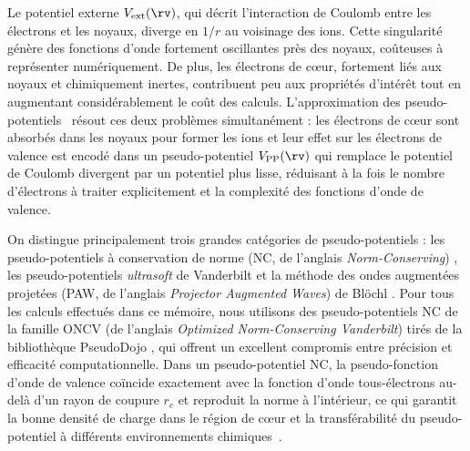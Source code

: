 Le potentiel externe $V_\text{ext}(\rv)$, qui décrit l'interaction de Coulomb entre les électrons et les noyaux, diverge en $1/r$ au voisinage des ions. Cette singularité génère des fonctions d'onde fortement oscillantes près des noyaux, coûteuses à représenter numériquement. De plus, les électrons de c\oe ur, fortement liés aux noyaux et chimiquement inertes, contribuent peu aux propriétés d'intérêt tout en augmentant considérablement le coût des calculs. L'approximation des pseudo-potentiels~\cite{phillipsEnergyBandInterpolationScheme1958,phillipsNewMethodCalculating1959} résout ces deux problèmes simultanément : les électrons de c\oe ur sont absorbés dans les noyaux pour former les ions et leur effet sur les électrons de valence est encodé dans un pseudo-potentiel $V_\text{PP}(\rv)$ qui remplace le potentiel de Coulomb divergent par un potentiel plus lisse, réduisant à la fois le nombre d'électrons à traiter explicitement et la complexité des fonctions d'onde de valence.

On distingue principalement trois grandes catégories de pseudo-potentiels : les pseudo-potentiels à conservation de norme (NC, de l'anglais \textit{Norm-Conserving}) \cite{hamannNormConservingPseudopotentials1979}, les pseudo-potentiels \textit{ultrasoft} de Vanderbilt \cite{vanderbiltSoftSelfconsistentPseudopotentials1990} et la méthode des ondes augmentées projetées (PAW, de l'anglais \textit{Projector Augmented Waves}) de Blöchl \cite{blochlProjectorAugmentedwaveMethod1994}. Pour tous les calculs effectués dans ce mémoire, nous utilisons des pseudo-potentiels NC de la famille ONCV (de l'anglais \textit{Optimized Norm-Conserving Vanderbilt}) tirés de la bibliothèque PseudoDojo \cite{vansettenPseudoDojoTrainingGrading2018}, qui offrent un excellent compromis entre précision et efficacité computationnelle. Dans un pseudo-potentiel NC, la pseudo-fonction d'onde de valence coïncide exactement avec la fonction d'onde tous-électrons au-delà d'un rayon de coupure $r_c$ et reproduit la norme à l'intérieur, ce qui garantit la bonne densité de charge dans le région de c\oe ur et la transférabilité du pseudo-potentiel à différents environnements chimiques~\cite{hamannGeneralizedNormconservingPseudopotentials1989,troullierEfficientPseudopotentialsPlanewave1991}.

